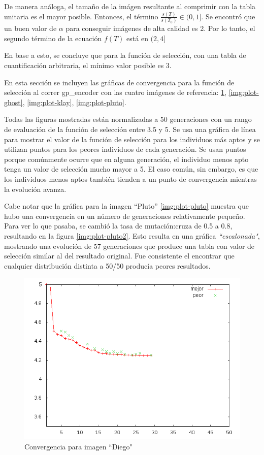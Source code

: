 De manera análoga, el tamaño de la imágen resultante al comprimir con la tabla
unitaria es el mayor posible. Entonces, el término $\frac{s(T)}{s(T_0)} \in (0,
1]$. Se encontró que un buen valor de $\alpha$ para conseguir imágenes de alta
calidad es 2. Por lo tanto, el segundo término de la ecuación $f(T)$ está en
$(2, 4]$

En base a esto, se concluye que para la función de selección, con una tabla de
cuantificación arbitraria, el mínimo valor posible es 3.

En esta sección se incluyen las gráficas de convergencia para la función de
selección al correr gp\_encoder con las cuatro imágenes de referencia:
\ref{img:plot-diego}, \ref{img:plot-ghost}, \ref{img:plot-klay}, \ref{img:plot-pluto}.

Todas las figuras mostradas están normalizadas a 50 generaciones con un rango
de evaluación de la función de selección entre 3.5 y 5. Se usa una gráfica de
línea para mostrar el valor de la función de selección para los individuos más
aptos y se utilizan puntos para los peores individuos de cada generación. Se
usan puntos porque comúnmente ocurre que en alguna generación, el individuo
menos apto tenga un valor de selección mucho mayor a 5. El caso común, sin
embargo, es que los individuos menos aptos también tienden a un punto de
convergencia mientras la evolución avanza.

Cabe notar que la gráfica para la imagen ``Pluto'' \ref{img:plot-pluto} muestra
que hubo una convergencia en un número de generaciones relativamente pequeño.
Para ver lo que pasaba, se cambió la tasa de mutación:cruza de 0.5 a 0.8,
resultando en la figura \ref{img:plot-pluto2}. Esto resulta en una gráfica
\emph{``escalonada"}, mostrando una evolución de 57 generaciones que produce
una tabla con valor de selección similar al del resultado original. Fue
consistente el encontrar que cualquier distribución distinta a 50/50 producía
peores resultados.

\begin{figure}[b]
    \includegraphics[width=1.0\textwidth]{plot_diego}
    \caption{Convergencia para imagen ``Diego"}
    \label{img:plot-diego}
\end{figure}

